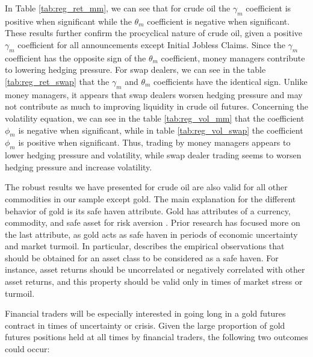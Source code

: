 \documentclass[12pt]{article}
\begin{document}
In Table \ref{tab:reg_ret_mm}, we can see that for crude oil the  $\gamma_m$ coefficient is positive when significant while the  $\theta_m$ coefficient is negative when significant. These results further confirm the procyclical nature of crude oil, given a positive $\gamma_m$ coefficient for all announcements except Initial Jobless Claims. Since the $\gamma_m$ coefficient has the opposite sign of the $\theta_m$ coefficient, money managers contribute to lowering hedging pressure. For swap dealers, we can see in the table \ref{tab:reg_ret_swap} that the $\gamma_m$ and $\theta_m$ coefficients  have the identical sign.  Unlike  money managers, it appears that swap dealers worsen hedging pressure and may not contribute as much to improving liquidity in crude oil futures. Concerning the volatility equation, we can see in the table \ref{tab:reg_vol_mm} that the coefficient $\phi_m$ is negative when significant, while in table \ref{tab:reg_vol_swap} the coefficient $\phi_m$ is positive when significant. Thus, trading by money managers appears to lower hedging pressure and volatility, while swap dealer trading seems to worsen hedging pressure and increase volatility.%

The robust results we have presented for crude oil are also valid for all other commodities in our sample except gold. The main explanation for the different behavior of gold is its safe haven attribute. Gold has attributes of a currency,  commodity, and safe asset for risk aversion \citep{wu2019does}. Prior research has focused more on the last attribute, as gold acts as safe haven in periods of economic uncertainty and market turmoil.  In particular, \citet{baur2010gold} describes the empirical observations that should be obtained for an asset class to be considered as a safe haven. For instance, asset returns should be uncorrelated or negatively correlated with other asset returns, and this property should be valid only in times of market stress or turmoil. 

Financial traders will be especially interested in going long in a gold futures contract in times of uncertainty or crisis. Given the large proportion of gold futures positions held at all times by financial traders, the following two outcomes could occur:
\end{document}
